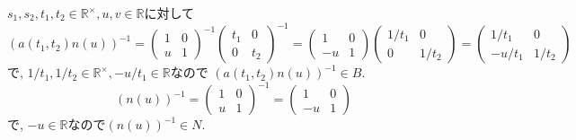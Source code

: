 $s_1,s_2,t_1,t_2 \in \mathbb{R}^\times, u,v \in \mathbb{R}$に対して
\[
(a(t_1,t_2)n(u))^{-1}=\begin{pmatrix} 1&0\\u&1 \end{pmatrix}^{-1}
\begin{pmatrix}t_1 & 0\\0&t_2\end{pmatrix}^{-1}
=\begin{pmatrix}
	1&0\\-u&1
\end{pmatrix}
\begin{pmatrix}
	1/t_1&0\\0&1/t_2
\end{pmatrix}
=\begin{pmatrix}
	1/t_1&0\\-u/t_1&1/t_2
\end{pmatrix}
\]
で, $1/t_1,1/t_2 \in \mathbb{R}^\times, -u/t_1\in \mathbb{R}$なので
$(a(t_1,t_2)n(u))^{-1} \in B$.
\[(n(u))^{-1}=\begin{pmatrix}
	1&0\\u&1
\end{pmatrix}^{-1}
=\begin{pmatrix}
	1&0\\-u&1
\end{pmatrix}
\]
で, $-u \in \mathbb{R}$なので$(n(u))^{-1} \in N$.

